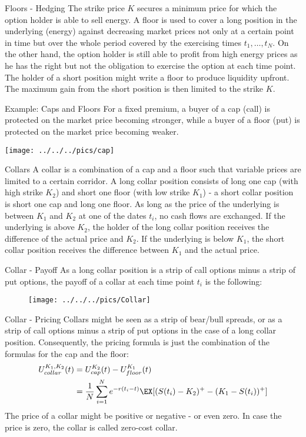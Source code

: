 {Floors - Hedging}
The strike price $K$ secures a minimum price for which the option holder is able to sell energy. A floor is used to cover a long position in the underlying (energy) against decreasing market prices not only at a certain point in time but over the whole period covered by the exercising times $t_1,\ldots,t_N$.
On the other hand, the option holder is still able to profit from high energy prices as he has the right but not the obligation to exercise the option at each time point. \\
The holder of a short position might write a floor to produce liquidity upfront. The maximum gain from the short position is then limited to the strike $K$.

{Example: Caps and Floors}
For a fixed premium, a buyer of a cap (call) is protected on the market price becoming stronger, while a buyer of a floor (put) is protected on the market price becoming weaker.\\
\begin{center}
\texttt{[image: ../../../pics/cap]}
\end{center}

{Collars}
A collar is a combination of a cap and a floor such that variable prices are limited to a certain corridor. A long collar position consists of long one cap (with high strike $K_2$) and short one floor (with low strike $K_1$) - a short collar position is short one cap and long one floor. As long as the price of the underlying is between $K_1$ and $K_2$ at one of the dates $t_i$, no cash flows are exchanged. If the underlying is above $K_2$, the holder of the long collar position receives the difference of the actual price and $K_2$. If the underlying is below $K_1$, the short collar position receives the difference between $K_1$ and the actual price.

{Collar - Payoff}
As a long collar position is a strip of call options minus a strip of put options, the payoff of a collar at each time point $t_i$ is the following:
\begin{figure}
	\centering
		\texttt{[image: ../../../pics/Collar]}
	\label{fig:Collar}
\end{figure}

{Collar - Pricing}
Collars might be seen as a strip of bear/bull spreads, or as a strip of call options minus a strip of put options in the case of a long collar position. Consequently, the pricing formula is just the combination of the formulas for the cap and the floor:
\begin{align*}
	U^{K_1, K_2}_{collar}(t)&=U^{K_2}_{cap}(t)-U^{K_1}_{floor}(t)\\
	&=\frac{1}{N}\sum_{i=1}^Ne^{-r(t_i-t)}\EX[(S(t_i)-K_2)^+ - (K_1-S(t_i))^+]
\end{align*}
The price of a collar might be positive or negative - or even zero. In case the price is zero, the collar is called zero-cost collar.

